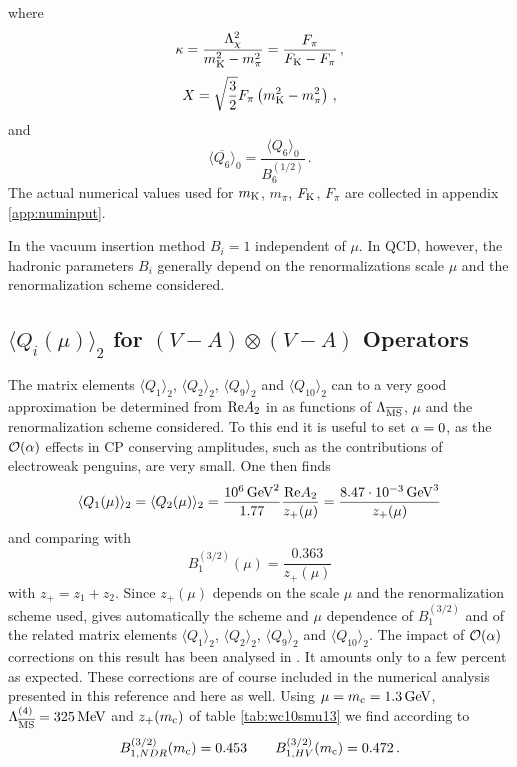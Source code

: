 where
\begin{equation}
\kappa = \frac{\Lambda_\chi^2}{m_{\rm K}^2 - m_\pi^2} =
         \frac{F_\pi}{F_{\rm K} - F_\pi} \, ,
\label{eq:kappaQi}
\end{equation}
\begin{equation}
X = \sqrt{\frac{3}{2}} F_\pi \left( m_{\rm K}^2 - m_\pi^2 \right) \, ,
\label{eq:XQi}
\end{equation}
and
\begin{equation}
\langle \overline{Q_6} \rangle_0 =
   \frac{\langle Q_6 \rangle_0}{B_6^{(1/2)}} \, .
\label{eq:Q60bar}
\end{equation}
The actual numerical values used for $m_{\rm K}$, $m_\pi$, $F_{\rm K}$,
$F_\pi$ are collected in appendix \ref{app:numinput}.

In the vacuum insertion method $B_i=1$ independent of $\mu$. In QCD,
however, the hadronic parameters $B_i$ generally depend on the
renormalizations scale $\mu$ and the renormalization scheme considered.

\subsection{$\langle Q_i(\mu) \rangle_2$ for $(V-A)\otimes (V-A)$ Operators}
           \label{subsec:Qi2VmAVmA}
The matrix elements $\langle Q_1 \rangle_2$, $\langle Q_2 \rangle_2$,
$\langle Q_9 \rangle_2$ and $\langle Q_{10} \rangle_2$ can to a very
good approximation be determined from ${\rm Re} A_2$ in
 as functions of $\Lambda_{\overline{\rm MS}}$, $\mu$ and the renormalization
scheme considered. To this end it is useful to set $\alpha=0$, as the
${\cal O}(\alpha)$ effects in CP conserving amplitudes, such as the
contributions of electroweak penguins, are very small. One then finds
\begin{equation}
\langle Q_1(\mu) \rangle_2 = \langle Q_2(\mu) \rangle_2 =
\frac{10^6\, {\rm GeV}^2}{1.77} \frac{{\rm Re} A_2}{z_+(\mu)} =
\frac{8.47 \cdot 10^{-3}\, {\rm GeV}^3}{z_+(\mu)}
\label{eq:Q122data}
\end{equation}
and comparing with 
\begin{equation}
B_1^{(3/2)}(\mu) = \frac{0.363}{z_+(\mu)}
\label{eq:B321}
\end{equation}
with $z_+ = z_1 + z_2$.
Since $z_+(\mu)$ depends on the scale $\mu$ and the renormalization
scheme used,  gives automatically the scheme and $\mu$
dependence of $B_1^{(3/2)}$ and of the related matrix elements $\langle
Q_1 \rangle_2$, $\langle Q_2 \rangle_2$,
$\langle Q_9 \rangle_2$ and $\langle Q_{10} \rangle_2$. The impact of
${\cal O}(\alpha)$ corrections on this result has been analysed in
\cite{burasetal:92d}. It amounts only to a few percent as expected.
These corrections are of course included in the numerical analysis
presented in this reference and here as well. Using $\mu=m_{\rm c}=1.3\, {\rm GeV}$,
$\Lambda_{\overline{\rm MS}}^{(4)}=325\, {\rm MeV}$ and $z_+(m_{\rm c})$ of table \ref{tab:wc10smu13}
we find according to 
\begin{equation}
B_{1,NDR}^{(3/2)}(m_{\rm c}) =  0.453
\qquad
B_{1,HV}^{(3/2)}(m_{\rm c}) =  0.472 \, .
\label{eq:B321mc}
\end{equation}

